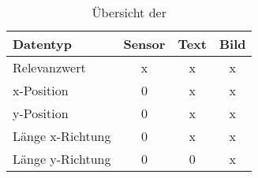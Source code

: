 \begin{longtable}{|lccc|}
\caption{{\"U}bersicht der } \\
\hline
\label{tab:RelevanzDatenBelegung}
\textbf{Datentyp} & \textbf{Sensor} & \textbf{Text} & \textbf{Bild}\\
\hline
  Relevanzwert     & x & x & x \\
  x-Position       & 0 & x & x \\
  y-Position       & 0 & x & x \\
  Länge x-Richtung & 0 & x & x \\
  Länge y-Richtung & 0 & 0 & x \\
\hline
\end{longtable}

